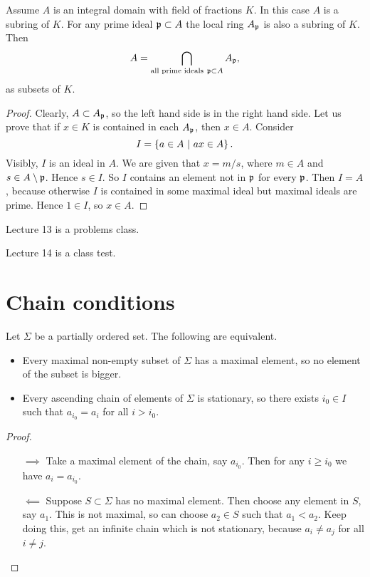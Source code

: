 \begin{corollary}
\label{cor:10.6}
Assume $ A $ is an integral domain with field of fractions $ K $. In this case $ A $ is a subring of $ K $. For any prime ideal $ \mathfrak{p} \subset A $ the local ring $ A_{\mathfrak{p}} $ is also a subring of $ K $. Then
$$ A = \bigcap_{\text{all prime ideals} \ \ppp \subset A} A_\ppp, $$
as subsets of $ K $.
\end{corollary}

\begin{proof}
Clearly, $ A \subset A_{\mathfrak{p}} $, so the left hand side is in the right hand side. Let us prove that if $ x \in K $ is contained in each $ A_{\mathfrak{p}} $, then $ x \in A $. Consider
$$ I = \cbr{a \in A \st ax \in A}. $$
Visibly, $ I $ is an ideal in $ A $. We are given that $ x = m / s $, where $ m \in A $ and $ s \in A \setminus \mathfrak{p} $. Hence $ s \in I $. So $ I $ contains an element not in $ \mathfrak{p} $ for every $ \mathfrak{p} $. Then $ I = A $, because otherwise $ I $ is contained in some maximal ideal but maximal ideals are prime. Hence $ 1 \in I $, so $ x \in A $.
\end{proof}


Lecture 13 is a problems class.


Lecture 14 is a class test.

\pagebreak

\section{Chain conditions}


\begin{lemma}
\label{lem:11.1}
Let $ \Sigma $ be a partially ordered set. The following are equivalent.
\begin{itemize}
\item Every maximal non-empty subset of $ \Sigma $ has a maximal element, so no element of the subset is bigger.
\item Every ascending chain of elements of $ \Sigma $ is stationary, so there exists $ i_0 \in I $ such that $ a_{i_0} = a_i $ for all $ i > i_0 $.
\end{itemize}
\end{lemma}

\begin{proof}
\hfill
\begin{enumerate}
\item[$ \implies $] Take a maximal element of the chain, say $ a_{i_0} $. Then for any $ i \ge i_0 $ we have $ a_i = a_{i_0} $.
\item[$ \impliedby $] Suppose $ S \subset \Sigma $ has no maximal element. Then choose any element in $ S $, say $ a_1 $. This is not maximal, so can choose $ a_2 \in S $ such that $ a_1 < a_2 $. Keep doing this, get an infinite chain which is not stationary, because $ a_i \ne a_j $ for all $ i \ne j $.
\end{enumerate}
\end{proof}

